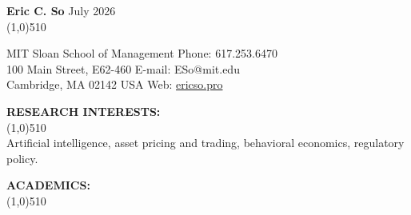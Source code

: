 \documentclass[11pt]{article}
\begin{document}
\setlength{\parindent}{0in}
{\bf \LARGE Eric C. So}  \hfill July 2026\\
\vskip -0.8cm \line(1,0){510} \\ \vskip -0.35cm

MIT Sloan School of Management  \hfill Phone:  617.253.6470\\            
100 Main Street, E62-460    \hfill  E-mail:  ESo@mit.edu\\         
Cambridge, MA  02142 USA \hfill    Web: \href{https://ericso.pro}{ericso.pro}\\
\vskip -0.5cm


\vskip 0.75cm
\setlength{\parindent}{0in}
{\bf RESEARCH INTERESTS:\\}
\vskip -0.85cm \line(1,0){510} \\
\setlength{\parindent}{0.5in}
Artificial intelligence, asset pricing and trading, behavioral economics, regulatory policy.

\vskip 0.75cm
\setlength{\parindent}{0in}
{\bf ACADEMICS:\\}
\vskip -0.85cm \line(1,0){510} \\ \vskip -0.5cm
\end{document}
